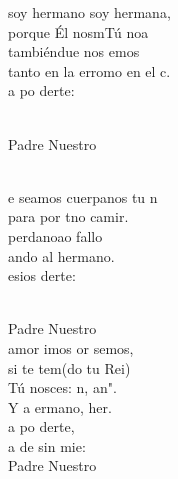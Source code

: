 \documentclass[12pt]{article}
\begin{document}
\begin{multicols*}{2}
\begin{cancion}%
	 soy hermano soy  hermana,\\
	porque Él nosmTú noa\\
	tambiéndue nos emos\\
	tanto en la erromo en el c.\\
	a po derte:\\\jump\\
	\begin{chorus}%
	Padre Nuestro   \\
	\end{chorus}%
	\jump\\
	e seamos cuerpanos tu n \\
	para por tno camir.\\
	perdanoao fallo\\
	ando al hermano.\\
	esios derte:\\\jump\\
	\begin{chorus}%
	Padre Nuestro   \\
\jump
	 amor imos or semos,\\
	si te tem(do tu Rei)\\
	Tú nosces: n, an".  \\
	Y a ermano, her.\\
	a po derte,\\
	a de sin mie:\\
	Padre Nuestro   \\
	\end{chorus}%
	\jump\\
\end{cancion}%


\end{multicols*}
\end{document}

